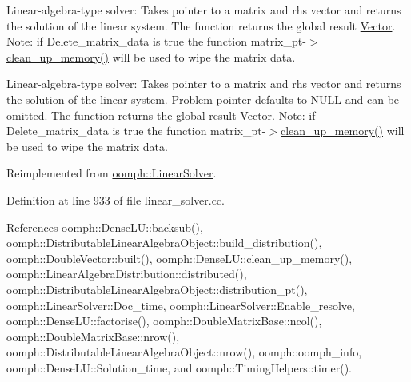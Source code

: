 Linear-\/algebra-\/type solver\+: Takes pointer to a matrix and rhs vector and returns the solution of the linear system. The function returns the global result \hyperlink{classoomph_1_1Vector}{Vector}. Note\+: if Delete\+\_\+matrix\+\_\+data is true the function matrix\+\_\+pt-\/$>$\hyperlink{classoomph_1_1SuperLUSolver_aec78b96a8f831a89f9b8fb48b1ce0c68}{clean\+\_\+up\+\_\+memory()} will be used to wipe the matrix data. 

Linear-\/algebra-\/type solver\+: Takes pointer to a matrix and rhs vector and returns the solution of the linear system. \hyperlink{classoomph_1_1Problem}{Problem} pointer defaults to N\+U\+LL and can be omitted. The function returns the global result \hyperlink{classoomph_1_1Vector}{Vector}. Note\+: if Delete\+\_\+matrix\+\_\+data is true the function matrix\+\_\+pt-\/$>$\hyperlink{classoomph_1_1SuperLUSolver_aec78b96a8f831a89f9b8fb48b1ce0c68}{clean\+\_\+up\+\_\+memory()} will be used to wipe the matrix data. 

Reimplemented from \hyperlink{classoomph_1_1LinearSolver_a546c09822d18191df14caed864c04c09}{oomph\+::\+Linear\+Solver}.



Definition at line 933 of file linear\+\_\+solver.\+cc.



References oomph\+::\+Dense\+L\+U\+::backsub(), oomph\+::\+Distributable\+Linear\+Algebra\+Object\+::build\+\_\+distribution(), oomph\+::\+Double\+Vector\+::built(), oomph\+::\+Dense\+L\+U\+::clean\+\_\+up\+\_\+memory(), oomph\+::\+Linear\+Algebra\+Distribution\+::distributed(), oomph\+::\+Distributable\+Linear\+Algebra\+Object\+::distribution\+\_\+pt(), oomph\+::\+Linear\+Solver\+::\+Doc\+\_\+time, oomph\+::\+Linear\+Solver\+::\+Enable\+\_\+resolve, oomph\+::\+Dense\+L\+U\+::factorise(), oomph\+::\+Double\+Matrix\+Base\+::ncol(), oomph\+::\+Double\+Matrix\+Base\+::nrow(), oomph\+::\+Distributable\+Linear\+Algebra\+Object\+::nrow(), oomph\+::oomph\+\_\+info, oomph\+::\+Dense\+L\+U\+::\+Solution\+\_\+time, and oomph\+::\+Timing\+Helpers\+::timer().

\mbox{\label{classoomph_1_1SuperLUSolver_abd96a292e666e7553651add727265529}} 
